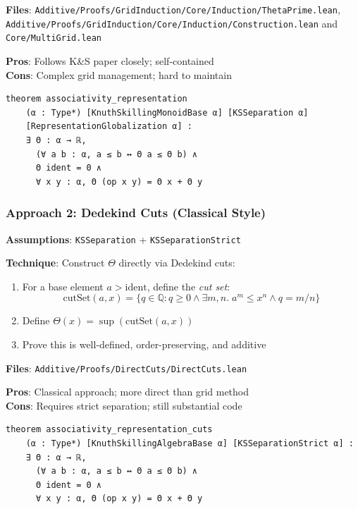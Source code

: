 \documentclass[11pt]{article}
\theoremstyle{definition}
\theoremstyle{remark}
\begin{document}
\textbf{Files}: \texttt{Additive/Proofs/GridInduction/Core/Induction/ThetaPrime.lean}, \\
\hspace*{2em} \texttt{Additive/Proofs/GridInduction/Core/Induction/Construction.lean} and \texttt{Core/MultiGrid.lean}

\textbf{Pros}: Follows K\&S paper closely; self-contained \\
\textbf{Cons}: Complex grid management; hard to maintain

\begin{lstlisting}[caption={Grid-based representation theorem}]
theorem associativity_representation
    (α : Type*) [KnuthSkillingMonoidBase α] [KSSeparation α]
    [RepresentationGlobalization α] :
    ∃ Θ : α → ℝ,
      (∀ a b : α, a ≤ b ↔ Θ a ≤ Θ b) ∧
      Θ ident = 0 ∧
      ∀ x y : α, Θ (op x y) = Θ x + Θ y
\end{lstlisting}

\subsubsection{Approach 2: Dedekind Cuts (Classical Style)}

\textbf{Assumptions}: \texttt{KSSeparation} + \texttt{KSSeparationStrict}

\textbf{Technique}: Construct $\Theta$ directly via Dedekind cuts:
\begin{enumerate}
\item For a base element $a > \text{ident}$, define the \emph{cut set}:
  \[\text{cutSet}(a, x) = \{q \in \mathbb{Q} : q \geq 0 \land \exists m,n.\; a^m \leq x^n \land q = m/n\}\]
\item Define $\Theta(x) = \sup(\text{cutSet}(a, x))$
\item Prove this is well-defined, order-preserving, and additive
\end{enumerate}

\textbf{Files}: \texttt{Additive/Proofs/DirectCuts/DirectCuts.lean}

\textbf{Pros}: Classical approach; more direct than grid method \\
\textbf{Cons}: Requires strict separation; still substantial code

\begin{lstlisting}[caption={Cuts-based representation theorem}]
theorem associativity_representation_cuts
    (α : Type*) [KnuthSkillingAlgebraBase α] [KSSeparationStrict α] :
    ∃ Θ : α → ℝ,
      (∀ a b : α, a ≤ b ↔ Θ a ≤ Θ b) ∧
      Θ ident = 0 ∧
      ∀ x y : α, Θ (op x y) = Θ x + Θ y
\end{lstlisting}
\end{document}
